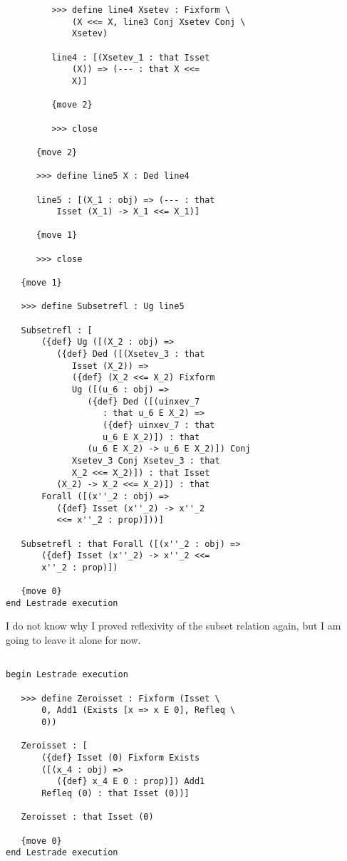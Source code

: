 \documentclass[12pt]{article}
\begin{document}
\begin{verbatim}
         >>> define line4 Xsetev : Fixform \
             (X <<= X, line3 Conj Xsetev Conj \
             Xsetev)

         line4 : [(Xsetev_1 : that Isset 
             (X)) => (--- : that X <<= 
             X)]

         {move 2}

         >>> close

      {move 2}

      >>> define line5 X : Ded line4

      line5 : [(X_1 : obj) => (--- : that 
          Isset (X_1) -> X_1 <<= X_1)]

      {move 1}

      >>> close

   {move 1}

   >>> define Subsetrefl : Ug line5

   Subsetrefl : [
       ({def} Ug ([(X_2 : obj) => 
          ({def} Ded ([(Xsetev_3 : that 
             Isset (X_2)) => 
             ({def} (X_2 <<= X_2) Fixform 
             Ug ([(u_6 : obj) => 
                ({def} Ded ([(uinxev_7 
                   : that u_6 E X_2) => 
                   ({def} uinxev_7 : that 
                   u_6 E X_2)]) : that 
                (u_6 E X_2) -> u_6 E X_2)]) Conj 
             Xsetev_3 Conj Xsetev_3 : that 
             X_2 <<= X_2)]) : that Isset 
          (X_2) -> X_2 <<= X_2)]) : that 
       Forall ([(x''_2 : obj) => 
          ({def} Isset (x''_2) -> x''_2 
          <<= x''_2 : prop)]))]

   Subsetrefl : that Forall ([(x''_2 : obj) => 
       ({def} Isset (x''_2) -> x''_2 <<= 
       x''_2 : prop)])

   {move 0}
end Lestrade execution
\end{verbatim}

I do not know why I proved reflexivity of the subset relation again, but I am going to leave it alone for now.

\begin{verbatim}

begin Lestrade execution

   >>> define Zeroisset : Fixform (Isset \
       0, Add1 (Exists [x => x E 0], Refleq \
       0))

   Zeroisset : [
       ({def} Isset (0) Fixform Exists 
       ([(x_4 : obj) => 
          ({def} x_4 E 0 : prop)]) Add1 
       Refleq (0) : that Isset (0))]

   Zeroisset : that Isset (0)

   {move 0}
end Lestrade execution
\end{verbatim}
\end{document}
